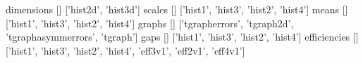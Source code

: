 \begin{footnotesize}
\begin{pyglist}
dimensions [] ['hist2d', 'hist3d']
scales [] ['hist1', 'hist3', 'hist2', 'hist4']
means [] ['hist1', 'hist3', 'hist2', 'hist4']
graphs [] ['tgrapherrors', 'tgraph2d', 'tgraphasymmerrors', 'tgraph']
gaps [] ['hist1', 'hist3', 'hist2', 'hist4']
efficiencies [] ['hist1', 'hist3', 'hist2', 'hist4', 'eff3v1', 'eff2v1', 'eff4v1']
\end{pyglist}
\end{footnotesize}
